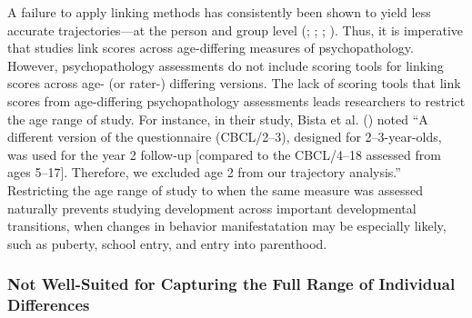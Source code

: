 \documentclass[
  american,
  letterpaper,
  12pt]{article}
\begin{document}
A failure to apply linking methods has consistently been shown to yield
less accurate trajectories---at the person and group level
(;
;
;
). Thus,
it is imperative that studies link scores across age-differing measures
of psychopathology. However, psychopathology assessments do not include
scoring tools for linking scores across age- (or rater-) differing
versions. The lack of scoring tools that link scores from age-differing
psychopathology assessments leads researchers to restrict the age range
of study. For instance, in their study, Bista et al.
() noted ``A different version of
the questionnaire (CBCL/2--3), designed for 2--3-year-olds, was used for
the year 2 follow-up {[}compared to the CBCL/4--18 assessed from ages
5--17{]}. Therefore, we excluded age 2 from our trajectory analysis.''
Restricting the age range of study to when the same measure was assessed
naturally prevents studying development across important developmental
transitions, when changes in behavior manifestatation may be especially
likely, such as puberty, school entry, and entry into parenthood.

\subsubsection{Not Well-Suited for Capturing the Full Range of
Individual
Differences}\label{not-well-suited-for-capturing-the-full-range-of-individual-differences}
\end{document}
